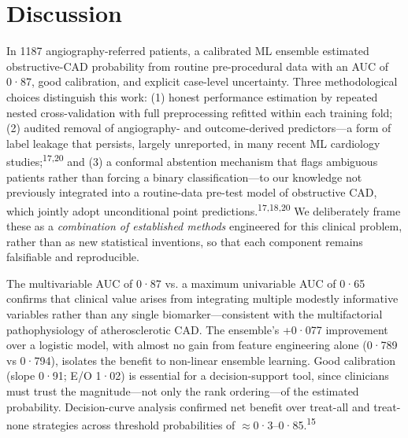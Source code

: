 \documentclass[english,11pt]{article}
\begin{document}
\section*{Discussion}

In 1187 angiography-referred patients, a calibrated ML ensemble estimated obstructive-CAD probability from routine pre-procedural data with an AUC of 0·87, good calibration, and explicit case-level uncertainty. Three methodological choices distinguish this work: (1) honest performance estimation by repeated nested cross-validation with full preprocessing refitted within each training fold; (2) audited removal of angiography- and outcome-derived predictors---a form of label leakage that persists, largely unreported, in many recent ML cardiology studies;\textsuperscript{17,20} and (3) a conformal abstention mechanism that flags ambiguous patients rather than forcing a binary classification---to our knowledge not previously integrated into a routine-data pre-test model of obstructive CAD, which jointly adopt unconditional point predictions.\textsuperscript{17,18,20} We deliberately frame these as a \emph{combination of established methods} engineered for this clinical problem, rather than as new statistical inventions, so that each component remains falsifiable and reproducible.

The multivariable AUC of 0·87 vs. a maximum univariable AUC of 0·65 confirms that clinical value arises from integrating multiple modestly informative variables rather than any single biomarker---consistent with the multifactorial pathophysiology of atherosclerotic CAD. The ensemble's +0·077 improvement over a logistic model, with almost no gain from feature engineering alone (0·789 vs 0·794), isolates the benefit to non-linear ensemble learning. Good calibration (slope 0·91; E/O 1·02) is essential for a decision-support tool, since clinicians must trust the magnitude---not only the rank ordering---of the estimated probability. Decision-curve analysis confirmed net benefit over treat-all and treat-none strategies across threshold probabilities of $\approx$0·3--0·85.\textsuperscript{15}
\end{document}
